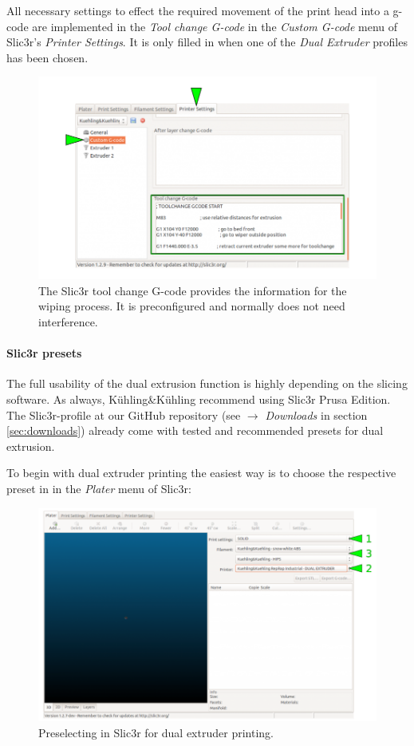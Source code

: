 All necessary settings to effect the required movement of the print head into a g-code are implemented in the \emph{Tool change G-code} in the \emph{Custom G-code} menu 
of Slic3r's \emph{Printer Settings}. It is only filled in when one of the 
\emph{Dual Extruder} profiles has been chosen.

\begin{figure}[H]
  \centering
  \includegraphics[width=.7\linewidth]{./img/slic3r_printer_toolchangegcode.png}
  \caption{The Slic3r tool change G-code provides the information for the wiping process. 
           It is preconfigured and normally does not need interference.}
\end{figure}

\paragraph{Slic3r presets}

The full usability of the dual extrusion function is highly depending on the slicing software. As always, Kühling\&Kühling recommend using Slic3r Prusa Edition.
The Slic3r-profile at our GitHub repository (see $\rightarrow$ \emph{Downloads} in section \ref{sec:downloads}) already come with tested and recommended presets for dual extrusion. 

To begin with dual extruder printing the easiest way is to choose the respective preset in in the \emph{Plater} menu of Slic3r: 

\begin{figure}[H]
  \centering
  \includegraphics[width=.7\linewidth]{./img/slic3r_dualex_plater.png}
  \caption{Preselecting in Slic3r for dual extruder printing.}
\end{figure}

